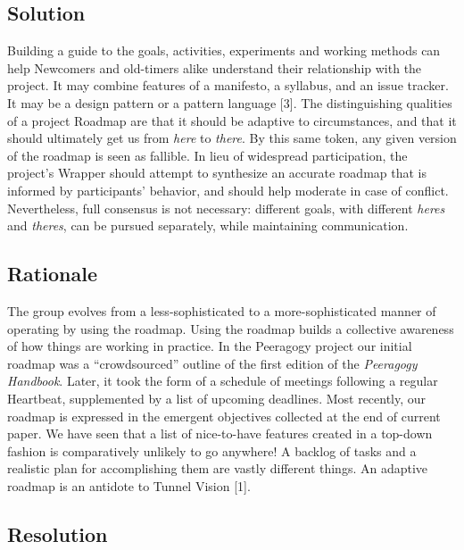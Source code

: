 \hypertarget{solution}{%
\subsection{Solution}\label{solution}}

Building a guide to the goals, activities, experiments and working
methods can help {{Newcomers}} and old-timers alike understand their
relationship with the project. It may combine features of a manifesto, a
syllabus, and an issue tracker. It may be a design pattern or a pattern
language {{[}3{]}}. The distinguishing qualities of a project Roadmap
are that it should be adaptive to circumstances, and that it should
ultimately get us from \emph{here} to \emph{there}. By this same token,
any given version of the roadmap is seen as fallible. In lieu of
widespread participation, the project's {{Wrapper}} should attempt to
synthesize an accurate roadmap that is informed by participants'
behavior, and should help moderate in case of conflict. Nevertheless,
full consensus is not necessary: different goals, with different
\emph{heres} and \emph{theres}, can be pursued separately, while
maintaining communication.

\hypertarget{rationale}{%
\subsection{Rationale}\label{rationale}}

The group evolves from a less-sophisticated to a more-sophisticated
manner of operating by using the roadmap. Using the roadmap builds a
collective awareness of how things are working in practice. In the
Peeragogy project our initial roadmap was a ``crowdsourced'' outline of
the first edition of the \emph{Peeragogy Handbook}. Later, it took the
form of a schedule of meetings following a regular {{Heartbeat}},
supplemented by a list of upcoming deadlines. Most recently, our roadmap
is expressed in the emergent objectives collected at the end of current
paper. We have seen that a list of nice-to-have features created in a
top-down fashion is comparatively unlikely to go anywhere! A backlog of
tasks and a realistic plan for accomplishing them are vastly different
things. An adaptive roadmap is an antidote to {{Tunnel Vision}}
{{[}1{]}}.

\hypertarget{resolution}{%
\subsection{Resolution}\label{resolution}}


